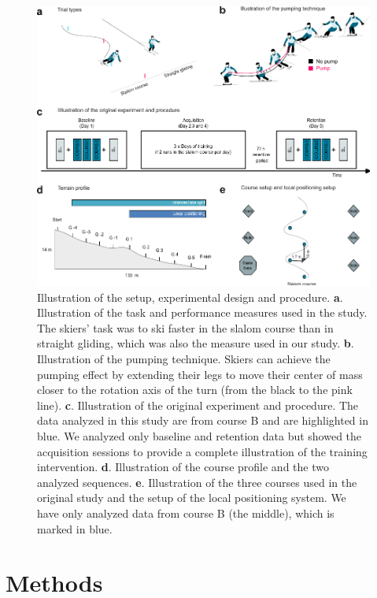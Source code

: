 \documentclass{article}
\begin{document}
\begin{figure}
    \centering
    \includegraphics[width=1\linewidth]{figurer/figure_design_4.pdf}
    \caption{Illustration of the setup, experimental design and procedure. \textbf{a}. Illustration of the task and performance measures used in the study. The skiers' task was to ski faster in the slalom course than in straight gliding, which was also the measure used in our study. \textbf{b}. Illustration of the pumping technique. Skiers can achieve the pumping effect by extending their legs to move their center of mass closer to the rotation axis of the turn (from the black to the pink line). \textbf{c}. Illustration of the original experiment and procedure. The data analyzed in this study are from course B and are highlighted in blue. We analyzed only baseline and retention data but showed the acquisition sessions to provide a complete illustration of the training intervention. \textbf{d}. Illustration of the course profile and the two analyzed sequences. \textbf{e}. Illustration of the three courses used in the original study and the setup of the local positioning system. We have only analyzed data from course B (the middle), which is marked in blue.}
    \label{fig:designl}
\end{figure}








\section{Methods}
\end{document}
